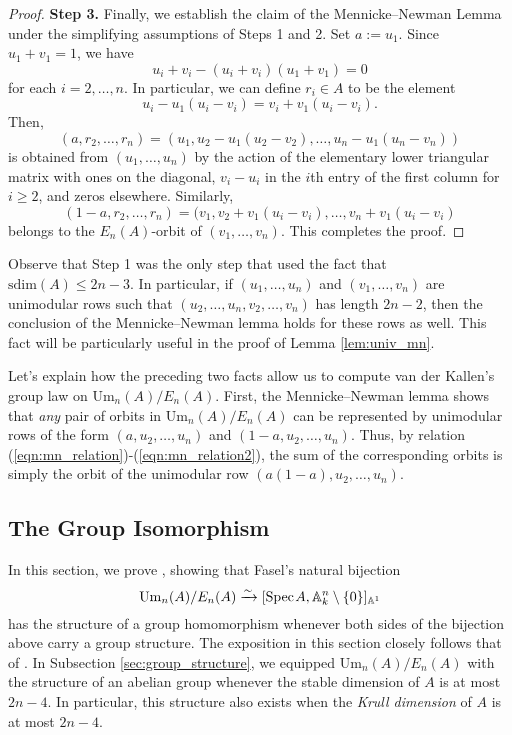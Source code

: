 \begin{proof}
    \textbf{Step 3.} Finally, we establish the claim of the Mennicke--Newman Lemma under the simplifying assumptions of Steps 1 and 2. Set $a := u_1$. Since $u_1 + v_1 = 1$, we have
    \[
    u_i + v_i - (u_i + v_i)(u_1 + v_1) = 0
    \]
    for each $i = 2,\ldots,n$. In particular, we can define $r_i \in A$ to be the element 
    \[
    u_i - u_1(u_i-v_i) = v_i + v_1(u_i-v_i). 
    \]
    Then, \[(a,r_2,\ldots,r_n) = (u_1,u_2-u_1(u_2-v_2), \ldots,u_n-u_1(u_n-v_n))\] is obtained from $(u_1,\ldots,u_n)$ by the action of the elementary lower triangular matrix with ones on the diagonal, $v_i-u_i$ in the $i$th entry of the first column for $i \geq 2$, and zeros elsewhere. Similarly, \[(1-a,r_2,\ldots,r_n) = (v_1,v_2 + v_1(u_i-v_i), \ldots,v_n + v_1(u_i-v_i)\] belongs to the $E_n(A)$-orbit of $(v_1,\ldots,v_n)$. This completes the proof.
\end{proof}

\begin{remark}\label{rem:no_dim_assumption}
    Observe that Step 1 was the only step that used the fact that $\mathrm{sdim}(A) \leq 2n-3$. In particular, if $(u_1,\ldots,u_n)$ and $(v_1,\ldots,v_n)$ are unimodular rows such that $(u_2,\ldots,u_n,v_2,\ldots,v_n)$ has length $2n-2$, then the conclusion of the Mennicke--Newman lemma holds for these rows as well. This fact will be particularly useful in the proof of Lemma \ref{lem:univ_mn}.
\end{remark}

Let's explain how the preceding two facts allow us to compute van der Kallen's group law on $\mathrm{Um}_n(A)/E_n(A)$. First, the Mennicke--Newman lemma shows that \textit{any} pair of orbits in $\mathrm{Um}_n(A)/E_n(A)$ can be represented by unimodular rows of the form $(a,u_2,\ldots,u_n)$ and $(1-a,u_2,\ldots,u_n)$. Thus, by relation (\ref{eqn:mn_relation})-(\ref{eqn:mn_relation2}), the sum of the corresponding orbits is simply the orbit of the unimodular row $(a(1-a),u_2,\ldots,u_n)$. 

\subsection{The Group Isomorphism}\label{sec:lerbet}

In this section, we prove \cite[Theorem 5.1]{Lerbet}, showing that Fasel's natural bijection 
\[
\mathrm{Um}_n(A)/E_n(A) \xrightarrow{\sim} [\text{Spec}\hspace{0.1em} A, \mathbb{A}^n_k\setminus\{0\}]_{\mathbb{A}^1}
\]
has the structure of a group homomorphism whenever both sides of the bijection above carry a group structure. The exposition in this section closely follows that of \cite[Section 5]{Lerbet}. In Subsection \ref{sec:group_structure}, we equipped $\mathrm{Um}_n(A)/E_n(A)$ with the structure of an abelian group whenever the stable dimension of $A$ is at most $2n-4$. In particular, this structure also exists when the \textit{Krull dimension} of $A$ is at most $2n-4$. 


